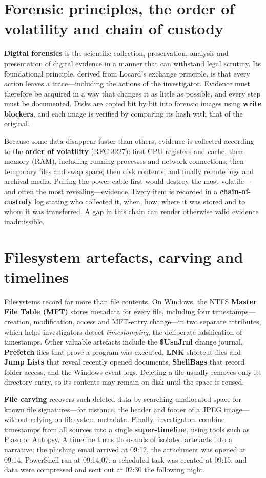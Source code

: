 \section{Forensic principles, the order of volatility and chain of custody}\label{sec:12.5}
\textbf{Digital forensics} is the scientific collection, preservation, analysis and presentation of digital evidence in a manner that can withstand legal scrutiny. Its foundational principle, derived from Locard's exchange principle, is that every action leaves a trace—including the actions of the investigator. Evidence must therefore be acquired in a way that changes it as little as possible, and every step must be documented. Disks are copied bit by bit into forensic images using \textbf{write blockers}, and each image is verified by comparing its hash with that of the original.

Because some data disappear faster than others, evidence is collected according to the \textbf{order of volatility} (RFC 3227): first CPU registers and cache, then memory (RAM), including running processes and network connections; then temporary files and swap space; then disk contents; and finally remote logs and archival media. Pulling the power cable first would destroy the most volatile—and often the most revealing—evidence. Every item is recorded in a \textbf{chain-of-custody} log stating who collected it, when, how, where it was stored and to whom it was transferred. A gap in this chain can render otherwise valid evidence inadmissible.

\section{Filesystem artefacts, carving and timelines}\label{sec:12.6}
Filesystems record far more than file contents. On Windows, the NTFS \textbf{Master File Table (MFT)} stores metadata for every file, including four timestamps—creation, modification, access and MFT-entry change—in two separate attributes, which helps investigators detect \emph{timestomping}, the deliberate falsification of timestamps. Other valuable artefacts include the \textbf{\$UsnJrnl} change journal, \textbf{Prefetch} files that prove a program was executed, \textbf{LNK} shortcut files and \textbf{Jump Lists} that reveal recently opened documents, \textbf{ShellBags} that record folder access, and the Windows event logs. Deleting a file usually removes only its directory entry, so its contents may remain on disk until the space is reused.

\textbf{File carving} recovers such deleted data by searching unallocated space for known file signatures—for instance, the header and footer of a JPEG image—without relying on filesystem metadata. Finally, investigators combine timestamps from all sources into a single \textbf{super-timeline}, using tools such as Plaso or Autopsy. A timeline turns thousands of isolated artefacts into a narrative: the phishing email arrived at 09:12, the attachment was opened at 09:14, PowerShell ran at 09:14:07, a scheduled task was created at 09:15, and data were compressed and sent out at 02:30 the following night.

